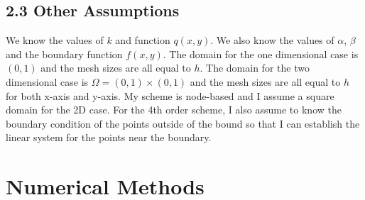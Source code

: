 \documentclass{article}
\begin{document}
\subsection*{2.3 Other Assumptions}
We know the values of $k$ and function $q(x, y)$. We also know the values of $\alpha$, $\beta$ and the boundary function $f(x, y)$. The domain for the one dimensional case is $(0, 1)$ and the mesh sizes are all equal to $h$. The domain for the two dimensional case is $\Omega = (0, 1)\times(0, 1)$ and the mesh sizes are all equal to $h$ for both x-axis and y-axis. My scheme is node-based and I assume a square domain for the 2D case. For the 4th order scheme, I also assume to know the boundary condition of the points outside of the bound so that I can establish the linear system for the points near the boundary.
 
\section{Numerical Methods}
\end{document}
